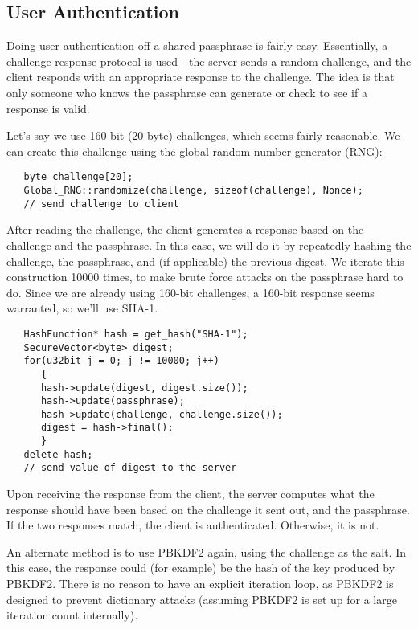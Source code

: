 \documentclass{article}
\begin{document}
\subsection{User Authentication}

Doing user authentication off a shared passphrase is fairly easy. Essentially,
a challenge-response protocol is used - the server sends a random challenge,
and the client responds with an appropriate response to the challenge. The idea
is that only someone who knows the passphrase can generate or check to see if a
response is valid.

Let's say we use 160-bit (20 byte) challenges, which seems fairly
reasonable. We can create this challenge using the global random
number generator (RNG):

\begin{verbatim}
   byte challenge[20];
   Global_RNG::randomize(challenge, sizeof(challenge), Nonce);
   // send challenge to client
\end{verbatim}

After reading the challenge, the client generates a response based on
the challenge and the passphrase. In this case, we will do it by
repeatedly hashing the challenge, the passphrase, and (if applicable)
the previous digest. We iterate this construction 10000 times, to make
brute force attacks on the passphrase hard to do. Since we are already
using 160-bit challenges, a 160-bit response seems warranted, so we'll
use SHA-1.

\begin{verbatim}
   HashFunction* hash = get_hash("SHA-1");
   SecureVector<byte> digest;
   for(u32bit j = 0; j != 10000; j++)
      {
      hash->update(digest, digest.size());
      hash->update(passphrase);
      hash->update(challenge, challenge.size());
      digest = hash->final();
      }
   delete hash;
   // send value of digest to the server
\end{verbatim}

Upon receiving the response from the client, the server computes what the
response should have been based on the challenge it sent out, and the
passphrase. If the two responses match, the client is authenticated.
Otherwise, it is not.

An alternate method is to use PBKDF2 again, using the challenge as the salt. In
this case, the response could (for example) be the hash of the key produced by
PBKDF2. There is no reason to have an explicit iteration loop, as PBKDF2 is
designed to prevent dictionary attacks (assuming PBKDF2 is set up for a large
iteration count internally).
\end{document}
